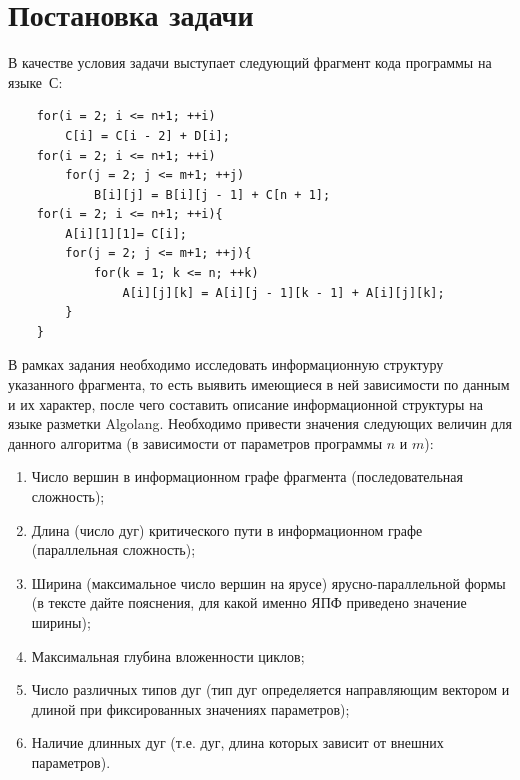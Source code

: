 

\usepackage[utf8]{inputenc}                %
\usepackage[main=russian, english]{babel}  %
\usepackage[pdftex]{graphicx}              %
\usepackage{indentfirst}                   %


    
    \tableofcontents
    \clearpage
    \section{Постановка задачи}

    В качестве условия задачи выступает следующий фрагмент кода программы на языке~С:
    \begin{verbatim}
    for(i = 2; i <= n+1; ++i)
        C[i] = C[i - 2] + D[i];
    for(i = 2; i <= n+1; ++i)
        for(j = 2; j <= m+1; ++j)
            B[i][j] = B[i][j - 1] + C[n + 1];
    for(i = 2; i <= n+1; ++i){
        A[i][1][1]= C[i];
        for(j = 2; j <= m+1; ++j){
            for(k = 1; k <= n; ++k)
                A[i][j][k] = A[i][j - 1][k - 1] + A[i][j][k];
        }
    }
    \end{verbatim}
    
    В рамках задания необходимо исследовать информационную структуру указанного фрагмента, то есть выявить имеющиеся в ней зависимости по данным и их характер, после чего составить описание информационной структуры на языке разметки Algolang.
    Необходимо привести значения следующих величин для данного алгоритма (в зависимости от параметров программы $n$ и $m$):
    \begin{enumerate}
        \item Число вершин в информационном графе фрагмента (последовательная сложность);
        \item Длина (число дуг) критического пути в информационном графе (параллельная сложность);
        \item Ширина (максимальное число вершин на ярусе) ярусно-параллельной формы (в тексте дайте пояснения, для какой именно ЯПФ приведено значение ширины);
        \item Максимальная глубина вложенности циклов;
        \item Число различных типов дуг (тип дуг определяется направляющим вектором и длиной при фиксированных значениях параметров);
        \item Наличие длинных дуг (т.е. дуг, длина которых зависит от внешних параметров).
    \end{enumerate}

